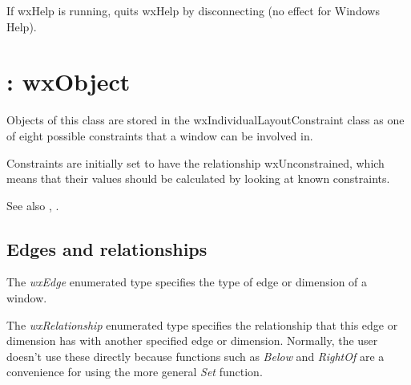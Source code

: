 

If wxHelp is running, quits wxHelp by disconnecting (no effect for Windows
Help).

\section{: wxObject}\label{wxindividuallayoutconstraint}


Objects of this class are stored in the wxIndividualLayoutConstraint class
as one of eight possible constraints that a window can be involved in.

Constraints are initially set to have the relationship wxUnconstrained,
which means that their values should be calculated by looking at known constraints.

%
See also , .

\subsection{Edges and relationships}

The {\it wxEdge} enumerated type specifies the type of edge or dimension of a window.

\begin{twocollist}\itemsep=0pt
\end{twocollist}

The {\it wxRelationship} enumerated type specifies the relationship that
this edge or dimension has with another specified edge or dimension. Normally, the user
doesn't use these directly because functions such as {\it Below} and {\it RightOf} are a convenience
for using the more general {\it Set} function.

